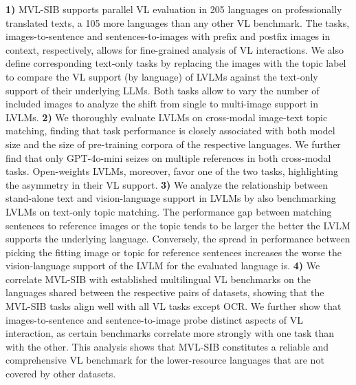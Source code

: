  \textbf{1)} MVL-SIB supports parallel VL evaluation in 205 languages on professionally translated texts, a 105 more languages than any other VL benchmark. The tasks, images-to-sentence and sentences-to-images with prefix and postfix images in context, respectively, allows for fine-grained analysis of VL interactions. We also define corresponding text-only tasks by replacing the images with the topic label to compare the VL support (by language) of LVLMs against the text-only support of their underlying LLMs. Both tasks allow to vary the number of included images to analyze the shift from single to multi-image support in LVLMs.
\textbf{2)} We thoroughly evaluate LVLMs on cross-modal image-text topic matching, finding that task performance is closely associated with both model size and the size of pre-training corpora of the respective languages. %
We further find that only GPT-4o-mini seizes on multiple references in both cross-modal tasks. Open-weights LVLMs, moreover, favor one of the two tasks, highlighting the asymmetry in their VL support.
\textbf{3)} We analyze the relationship between stand-alone text and vision-language support in LVLMs by also benchmarking LVLMs on text-only topic matching. The performance gap between matching sentences to reference images or the topic tends to be larger the better the LVLM supports the underlying language. Conversely, the spread in performance between picking the fitting image or topic for reference sentences increases the worse the vision-language support of the LVLM for the evaluated language is.
\textbf{4)} We correlate MVL-SIB with established multilingual VL benchmarks on the languages shared between the respective pairs of datasets, showing that the MVL-SIB tasks align well with all VL tasks except OCR. We further show that images-to-sentence and sentence-to-image probe distinct aspects of VL interaction, as certain benchmarks correlate more strongly with one task than with the other. This analysis shows that MVL-SIB constitutes a reliable and comprehensive VL benchmark for the lower-resource languages that are not covered by other datasets.
